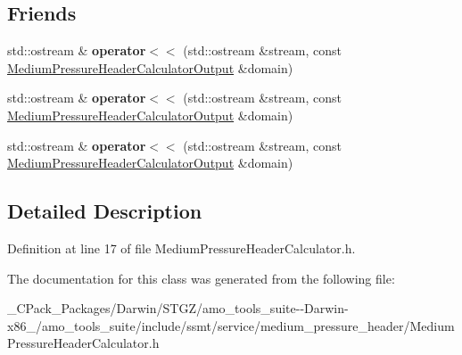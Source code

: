 \subsection*{Friends}
\begin{DoxyCompactItemize}
\item 
\mbox{\label{class_medium_pressure_header_calculator_output_a3444dcf0eebc66ba7ca95339233de630}} 
std\+::ostream \& {\bfseries operator$<$$<$} (std\+::ostream \&stream, const \hyperlink{class_medium_pressure_header_calculator_output}{Medium\+Pressure\+Header\+Calculator\+Output} \&domain)
\item 
\mbox{\label{class_medium_pressure_header_calculator_output_a3444dcf0eebc66ba7ca95339233de630}} 
std\+::ostream \& {\bfseries operator$<$$<$} (std\+::ostream \&stream, const \hyperlink{class_medium_pressure_header_calculator_output}{Medium\+Pressure\+Header\+Calculator\+Output} \&domain)
\item 
\mbox{\label{class_medium_pressure_header_calculator_output_a3444dcf0eebc66ba7ca95339233de630}} 
std\+::ostream \& {\bfseries operator$<$$<$} (std\+::ostream \&stream, const \hyperlink{class_medium_pressure_header_calculator_output}{Medium\+Pressure\+Header\+Calculator\+Output} \&domain)
\end{DoxyCompactItemize}


\subsection{Detailed Description}


Definition at line 17 of file Medium\+Pressure\+Header\+Calculator.\+h.



The documentation for this class was generated from the following file\+:\begin{DoxyCompactItemize}
\item 
\+\_\+\+C\+Pack\+\_\+\+Packages/\+Darwin/\+S\+T\+G\+Z/amo\+\_\+tools\+\_\+suite-\/-\/\+Darwin-\/x86\+\_/amo\+\_\+tools\+\_\+suite/include/ssmt/service/medium\+\_\+pressure\+\_\+header/Medium\+Pressure\+Header\+Calculator.\+h\end{DoxyCompactItemize}
